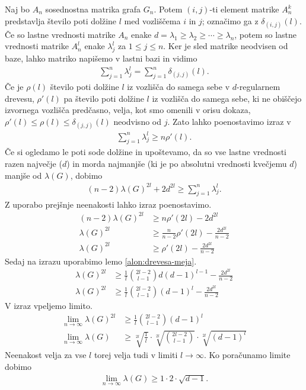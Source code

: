 \begin{dokaz}
    Naj bo \(A_n\) sosednostna matrika grafa \(G_n\). Potem \((i,j)\)-ti element matrike \(A_n^k\) predstavlja število poti dolžine \(l\) med vozliščema \(i\) in \(j\); označimo ga z \(\delta_{(i,j)}(l)\). Če so lastne vrednosti matrike \(A_n\) enake \(d=\lambda_1\geq \lambda_2 \geq \cdots \geq \lambda_n\), potem so lastne vrednosti matrike \(A_n^l\) enake \(\lambda_j^l\) za \(1\leq j \leq n\). Ker je sled matrike neodvisen od baze, lahko  matriko napišemo v lastni bazi in vidimo
    \begin{align*}
        \sum_{j=1}^n \lambda_j^l = \sum_{j=1}^n \delta_{(j, j)}(l).
    \end{align*}
    Če je \(\rho(l)\) število poti dolžine \(l\) iz vozlišča do samega sebe v \(d\)-regularnem drevesu, \(\rho'(l)\) pa število poti dolžine \(l\) iz vozlišča do samega sebe, ki ne obiščejo izvornega vozlišča predčasno, velja, kot smo omenili v orisu dokaza, \(\rho'(l) \leq \rho(l)\leq \delta_{(j,j)}(l)\) neodvisno od \(j\). Zato lahko poenostavimo izraz v
    \begin{align*}
        \sum_{j=1}^n \lambda_j^l \geq n \rho'(l).
    \end{align*}
    Če si ogledamo le poti sode dolžine in upoštevamo, da so vse lastne vrednosti razen največje (\(d\)) in morda najmanjše (ki je po absolutni vrednosti kvečjemu \(d\)) manjše od \(\lambda(G)\), dobimo
    \begin{align*}
        (n-2)\lambda(G)^{2l} + 2d^{2l} \geq \sum_{j=1}^n \lambda_j^l.
    \end{align*}
    Z uporabo prejšnje neenakosti lahko izraz poenostavimo.
    \begin{align*}
        (n-2)\lambda(G)^{2l} &\geq n\rho'(2l) - 2d^{2l}\\
        \lambda(G)^{2l} &\geq \frac{n}{n-2}\rho'(2l) - \frac{2d^{2l}}{n-2}\\
        \lambda(G)^{2l} &\geq \rho'(2l) - \frac{2d^{2l}}{n-2}
    \end{align*}
    Sedaj na izrazu uporabimo lemo \ref{alon:drevesa-meja}.
    \begin{align*}
        \lambda(G)^{2l} &\geq \frac{1}{l}\binom{2l-2}{l-1}d(d-1)^{l-1} - \frac{2d^{2l}}{n-2} \\
        \lambda(G)^{2l} &\geq \frac{1}{l}\binom{2l-2}{l-1}(d-1)^{l} - \frac{2d^{2l}}{n-2}
    \end{align*}
    V izraz vpeljemo limito.
    \begin{align*}
        \lim_{n\to\infty} \lambda(G)^{2l} &\geq \frac{1}{l}\binom{2l-2}{l-1}(d-1)^{l}\\
        \lim_{n\to\infty} \lambda(G) &\geq \sqrt[2l]{\frac{1}{l}}\cdot \sqrt[2l]{\binom{2l-2}{l-1}}\cdot \sqrt[2l]{(d-1)^{l}}
    \end{align*}
    Neenakost velja za vse \(l\) torej velja tudi v limiti \(l\to\infty\). Ko poračunamo limite \cite{polatajko} dobimo
    \begin{align*}
        \lim_{n\to\infty} \lambda(G) \geq 1 \cdot 2 \cdot \sqrt{d-1}.
    \end{align*}
\end{dokaz}
